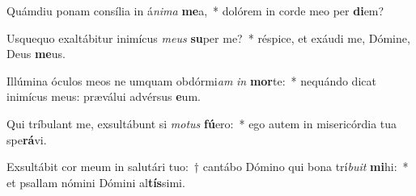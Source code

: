 \item Quámdiu ponam consília in á\textit{ni}\textit{ma} \textbf{me}a,~* dolórem in corde meo per \textbf{di}em?
\item Usquequo exaltábitur inimícus \textit{me}\textit{us} \textbf{su}per me?~* réspice, et exáudi me, Dómine, Deus \textbf{me}us.
\item Illúmina óculos meos ne umquam obdórmi\textit{am} \textit{in} \textbf{mor}te:~* nequándo dicat inimícus meus: præválui advérsus \textbf{e}um.
\item Qui tríbulant me, exsultábunt si \textit{mo}\textit{tus} \textbf{fú}ero:~* ego autem in misericórdia tua spe\textbf{rá}vi.
\item Exsultábit cor meum in salutári tuo:~† cantábo Dómino qui bona trí\textit{bu}\textit{it} \textbf{mi}hi:~* et psallam nómini Dómini al\textbf{tís}simi.
